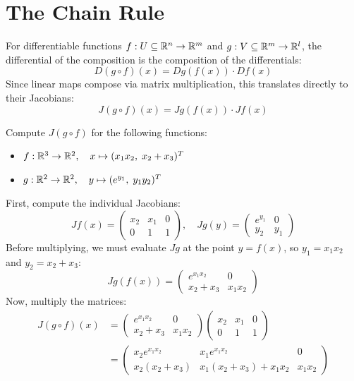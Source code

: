 \hrulefill

\section{The Chain Rule}

For differentiable functions $f: U \subseteq \mathbb{R}^n \to \mathbb{R}^m$ and $g: V \subseteq \mathbb{R}^m \to \mathbb{R}^l$, the differential of the composition is the composition of the differentials:
\[ D(g \circ f)(x) = Dg(f(x)) \cdot Df(x) \]
Since linear maps compose via matrix multiplication, this translates directly to their Jacobians:
\[ J(g \circ f)(x) = Jg(f(x)) \cdot Jf(x) \]

\begin{exercise*}
Compute $J(g \circ f)$ for the following functions:
\begin{itemize}
    \item $f: \mathbb{R}^3 \to \mathbb{R}^2, \quad x \mapsto (x_1 x_2, \; x_2 + x_3)^T$
    \item $g: \mathbb{R}^2 \to \mathbb{R}^2, \quad y \mapsto (e^{y_1}, \; y_1 y_2)^T$
\end{itemize}
\end{exercise*}

\begin{solution}
First, compute the individual Jacobians:
\[ Jf(x) = \begin{pmatrix} x_2 & x_1 & 0 \\ 0 & 1 & 1 \end{pmatrix}, \quad Jg(y) = \begin{pmatrix} e^{y_1} & 0 \\ y_2 & y_1 \end{pmatrix} \]
Before multiplying, we must evaluate $Jg$ at the point $y = f(x)$, so $y_1 = x_1 x_2$ and $y_2 = x_2 + x_3$:
\[ Jg(f(x)) = \begin{pmatrix} e^{x_1 x_2} & 0 \\ x_2 + x_3 & x_1 x_2 \end{pmatrix} \]
Now, multiply the matrices:
\begin{equation}
    \begin{aligned}
        J(g \circ f)(x) &= \begin{pmatrix} e^{x_1 x_2} & 0 \\ x_2 + x_3 & x_1 x_2 \end{pmatrix} \begin{pmatrix} x_2 & x_1 & 0 \\ 0 & 1 & 1 \end{pmatrix} \\
        &= \begin{pmatrix} x_2 e^{x_1 x_2} & x_1 e^{x_1 x_2} & 0 \\ x_2(x_2 + x_3) & x_1(x_2 + x_3) + x_1 x_2 & x_1 x_2 \end{pmatrix}
    \end{aligned}
\end{equation}
\end{solution}

